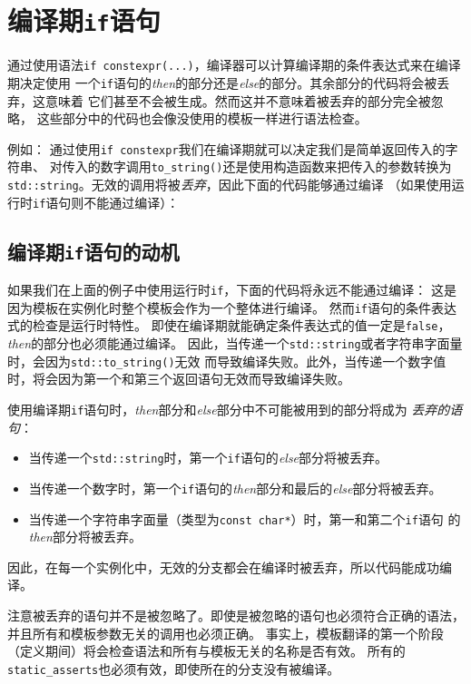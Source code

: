 \section{编译期\texttt{if}语句}\label{ch10}
通过使用语法\texttt{if constexpr(...)}，编译器可以计算编译期的条件表达式来在编译期决定使用
一个\texttt{if}语句的\emph{then}的部分还是\emph{else}的部分。其余部分的代码将会被丢弃，这意味着
它们甚至不会被生成。然而这并不意味着被丢弃的部分完全被忽略，
这些部分中的代码也会像没使用的模板一样进行语法检查。

例如：
通过使用\texttt{if constexpr}我们在编译期就可以决定我们是简单返回传入的字符串、
对传入的数字调用\texttt{to\_string()}还是使用构造函数来把传入的参数转换为
\texttt{std::string}。无效的调用将被\emph{丢弃}，因此下面的代码能够通过编译
（如果使用运行时\texttt{if}语句则不能通过编译）：

\subsection{编译期\texttt{if}语句的动机}
如果我们在上面的例子中使用运行时\texttt{if}，下面的代码将永远不能通过编译：
这是因为模板在实例化时整个模板会作为一个整体进行编译。
然而\texttt{if}语句的条件表达式的检查是运行时特性。
即使在编译期就能确定条件表达式的值一定是\texttt{false}，\emph{then}的部分也必须能通过编译。
因此，当传递一个\texttt{std::string}或者字符串字面量时，会因为\texttt{std::to\_string()}无效
而导致编译失败。此外，当传递一个数字值时，将会因为第一个和第三个返回语句无效而导致编译失败。

使用编译期\texttt{if}语句时，\emph{then}部分和\emph{else}部分中不可能被用到的部分将成为
\emph{丢弃的语句}：
\begin{itemize}[leftmargin=*]
    \item 当传递一个\texttt{std::string}时，第一个\texttt{if}语句的\emph{else}部分将被丢弃。
    \item 当传递一个数字时，第一个\texttt{if}语句的\emph{then}部分和最后的\emph{else}部分将被丢弃。
    \item 当传递一个字符串字面量（类型为\texttt{const char*}）时，第一和第二个\texttt{if}语句
    的\emph{then}部分将被丢弃。
\end{itemize}
因此，在每一个实例化中，无效的分支都会在编译时被丢弃，所以代码能成功编译。

注意被丢弃的语句并不是被忽略了。即使是被忽略的语句也必须符合正确的语法，
并且所有和模板参数无关的调用也必须正确。
事实上，模板翻译的第一个阶段（定义期间）将会检查语法和所有与模板无关的名称是否有效。
所有的\texttt{static\_asserts}也必须有效，即使所在的分支没有被编译。

